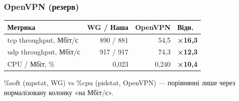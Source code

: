 \documentclass[aspectratio=43,14pt]{beamer}
\newcommand{\tstretch}[1]{\renewcommand{\arraystretch}{#1}}
\begin{document}
\begin{frame}
  \frametitle{OpenVPN (резерв)}
  \centering
  \vspace*{0.5em}
  {\small
  \tstretch{1.5}
  \begin{tabularx}{\textwidth}{@{}Xrrl@{}}
    \toprule
    \textbf{Метрика}
      & \textbf{WG / Наша}
      & \textbf{OpenVPN}
      & \textbf{Відн.} \\
    \midrule
    tcp throughput, Мбіт/с  & 890 / 881 & 54{,}5    & \textbf{×16,3} \\
    udp throughput, Мбіт/с  & 917 / 917 & 74{,}3    & \textbf{×12,3} \\
    CPU / Мбіт, \%          & 0{,}023   & 0{,}240   & \textbf{×10,4} \\
    \bottomrule
  \end{tabularx}
  }
  \vspace{0.5em}
  \par{\footnotesize\color{clGrey}
    \%soft (mpstat, WG) vs \%cpu (pidstat, OpenVPN) ---
    порівнянні лише через нормалізовану колонку «на Мбіт/с».}
\end{frame}
\end{document}
